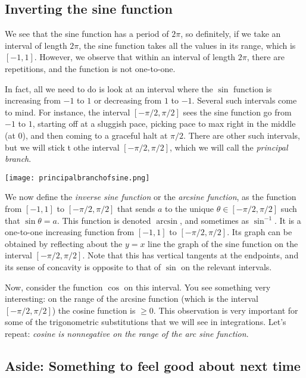 \documentclass{amsart}
\begin{document}
\subsection{Inverting the sine function}

We see that the sine function has a period of $2\pi$, so definitely,
if we take an interval of length $2\pi$, the sine function takes all
the values in its range, which is $[-1,1]$. However, we observe that
within an interval of length $2\pi$, there are repetitions, and the
function is not one-to-one.

In fact, all we need to do is look at an interval where the $\sin$
function is increasing from $-1$ to $1$ or decreasing from $1$ to
$-1$. Several such intervals come to mind. For instance, the interval
$[-\pi/2,\pi/2]$ sees the sine function go from $-1$ to $1$, starting
off at a sluggish pace, picking pace to max right in the middle (at
$0$), and then coming to a graceful halt at $\pi/2$. There are other
such intervals, but we will stick t othe interval $[-\pi/2,\pi/2]$,
which we will call the {\em principal branch}.

\texttt{[image: principalbranchofsine.png]}

We now define the {\em inverse sine function} or the {\em arcsine
function}, as the function from $[-1,1]$ to $[-\pi/2,\pi/2]$ that
sends $a$ to the unique $\theta \in [-\pi/2,\pi/2]$ such that $\sin
\theta = a$. This function is denoted $\arcsin$, and sometimes as
$\sin^{-1}$. It is a one-to-one increasing function from $[-1,1]$ to
$[-\pi/2,\pi/2]$. Its graph can be obtained by reflecting about the $y
= x$ line the graph of the sine function on the interval
$[-\pi/2,\pi/2]$. Note that this has vertical tangents at the
endpoints, and its sense of concavity is opposite to that of $\sin$ on
the relevant intervals.

Now, consider the function $\cos$ on this interval. You see something
very interesting: on the range of the arcsine function (which is the
interval $[-\pi/2,\pi/2]$) the cosine function is $\ge 0$. This
observation is very important for some of the trigonometric
substitutions that we will see in integrations. Let's repeat: {\em
cosine is nonnegative on the range of the arc sine function}.

\subsection*{Aside: Something to feel good about next time}
\end{document}
